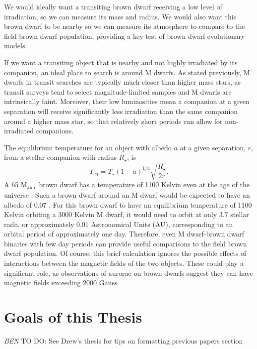 \documentclass[12pt]{caltech_thesis}
\newcommand{\todo}[3]{{\color{#2} \emph{#1} TO DO: #3}}
\newcommand{\btmtodo}[1]{\todo{BEN}{red}{#1}}
\newcommand{\rstar}{{$R_\star$}}
\newcommand{\mjup}{{M$_\textrm{Jup}$}}
\begin{document}
We would ideally want a transiting brown dwarf receiving a low level of irradiation,
so we can measure its mass and radius.
We would also want this brown dwarf to be nearby so we can measure its atmosphere to
compare to the field brown dwarf population, providing a key test of brown dwarf
evolutionary models.

If we want a transiting object that is nearby and not highly irradiated by its companion,
an ideal place to search is around M dwarfs. 
As stated previously, M dwarfs in transit searches are typically much closer than 
higher mass stars, as transit surveys tend to select magnitude-limited samples and
M dwarfs are intrinsically faint. 
Moreover, their low luminosities mean a companion at a given separation will receive
significantly less irradiation than the same companion around a higher mass star,
so that relatively short periods can allow for non-irradiated companions.

The equilibrium temperature for an object with albedo $a$ at a given separation, $r$, from a 
stellar companion with radius \rstar, is
\begin{equation}
T_{\textrm{eq}} = T_\star (1-a)^{1/4} \sqrt{\frac{R_\star}{2r}}.
\end{equation}
A 65 \mjup\ brown dwarf has a temperature of 1100 Kelvin even at the age of 
the universe \citep{Saumon08}. 
Such a brown dwarf around an M dwarf would be expected to have an albedo of
0.07 \citep{Marley99}.
For this brown dwarf to have an equilibrium temperature of 1100 Kelvin orbiting a
3000 Kelvin M dwarf, it would need to orbit at only 3.7 stellar radii, or approximately
0.01 Astronomical Units (AU), corresponding to an orbital period of approximately one day.
Therefore, even M dwarf-brown dwarf binaries with few day periods can provide useful 
comparisons to the field brown dwarf population.
Of course, this brief calculation ignores the possible effects of interactions between
the magnetic fields of the two objects. These could play a significant role, as 
observations of aurorae on brown dwarfs suggest they can have magnetic fields exceeding
2000 Gauss \citep{Hallinan15}






\section{Goals of this Thesis} 

\btmtodo{See Drew's thesis for tips on formatting previous papers section}
\end{document}
